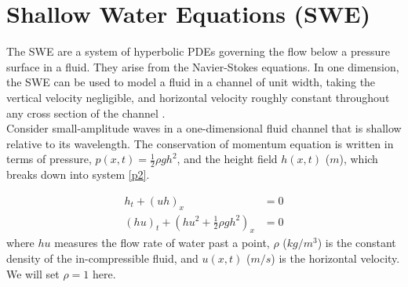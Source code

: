 \documentclass[12pt,a4paper]{article}
\begin{document}
	\section{Shallow Water Equations (SWE)}
	The SWE are a system of hyperbolic PDEs governing the flow below a pressure surface in a fluid. They arise from the Navier-Stokes equations.  In one dimension, the SWE  can be used to model a fluid in a channel of unit width, taking the vertical velocity negligible, and horizontal velocity roughly constant throughout any cross section of the channel \cite{ge:2008}.  \\
	
	Consider small-amplitude waves in a one-dimensional fluid channel that is shallow relative to its wavelength. The conservation of momentum equation is written in terms of pressure, $p(x,t) = \frac{1}{2}\rho gh^{2}$, and the height field $h(x,t)$ ($m$), which breaks down into system \eqref{p2}.
	
	\begin{equation}
		\begin{aligned}
			h_{t} + (uh)_x &= 0 \\
			(hu)_t + \left(hu^{2} + \frac{1}{2}\rho gh^{2} \right)_x & = 0 
		\end{aligned}
		\label{p2}
	\end{equation}	
	where $hu$ measures the flow rate of water past a point,  $\rho$ ($kg/m^3$) is the constant density of the in-compressible fluid, and $u(x,t)$ ($m/s$) is the horizontal velocity.  We will set $\rho = 1$ here.\\
	
\end{document}
